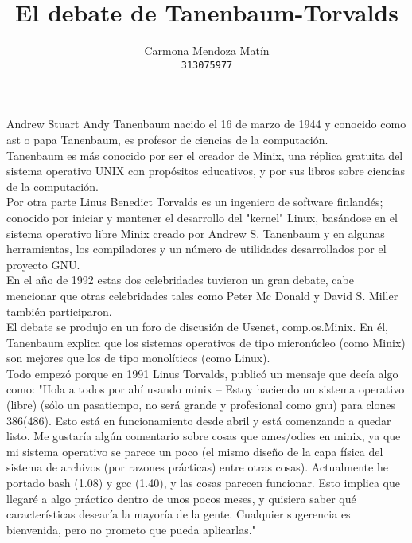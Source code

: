 \documentclass[11pt, a4paper]{report}
\begin{document}
\title{El debate de Tanenbaum-Torvalds}
\author{
  Carmona Mendoza Mat\'in\\
  \texttt{313075977}
}
\date{}
\maketitle

Andrew Stuart Andy Tanenbaum nacido el 16 de marzo de 1944 y conocido como ast
o papa Tanenbaum, es profesor de ciencias de la computación. \\

Tanenbaum es más conocido por ser el creador de Minix, una réplica gratuita del
sistema operativo UNIX con propósitos educativos, y por sus libros sobre
ciencias de la computación.\\

Por otra parte Linus Benedict Torvalds es un ingeniero de software finlandés;
conocido por iniciar y mantener el desarrollo del "kernel" Linux, basándose en
el sistema operativo libre Minix creado por Andrew S. Tanenbaum y en algunas
herramientas, los compiladores y un número de utilidades desarrollados por el
proyecto GNU.\\

En el año de 1992 estas dos celebridades tuvieron un gran debate, cabe
mencionar que otras celebridades tales como Peter Mc Donald y David S. Miller
también participaron.\\

El debate se produjo en un foro de discusión de Usenet, comp.os.Minix. En él,
Tanenbaum explica que los sistemas operativos de tipo micronúcleo (como Minix)
son mejores que los de tipo monolíticos (como Linux).\\

Todo empezó porque en 1991 Linus Torvalds, publicó un mensaje que decía algo
como:
"Hola a todos por ahí usando minix – Estoy haciendo un sistema operativo
(libre) (sólo un pasatiempo, no será grande y profesional como gnu) para clones
386(486). Esto está en funcionamiento desde abril y está comenzando a quedar
listo. Me gustaría algún comentario sobre cosas que ames/odies en minix, ya que
mi sistema operativo se parece un poco (el mismo diseño de la capa física del
sistema de archivos (por razones prácticas) entre otras cosas). Actualmente he
portado bash (1.08) y gcc (1.40), y las cosas parecen funcionar. Esto implica
que llegaré a algo práctico dentro de unos pocos meses, y quisiera saber qué
características desearía la mayoría de la gente. Cualquier sugerencia es
bienvenida, pero no prometo que pueda aplicarlas." \\
\end{document}
